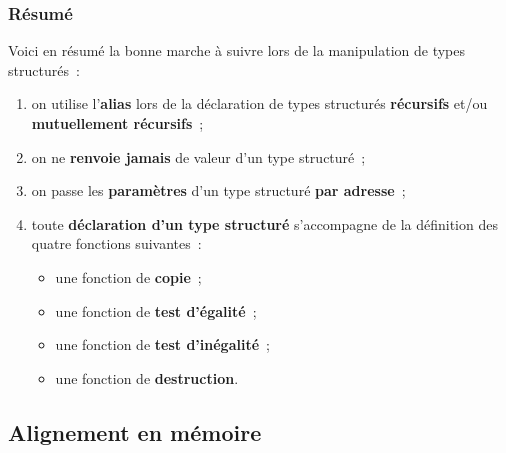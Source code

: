 \begin{frame}[fragile]
\frametitle{Résumé}
Voici en résumé la bonne marche à suivre lors de la manipulation de
types structurés~:
\smallskip

\begin{enumerate}
    \item on utilise l'{\bf alias} lors de la déclaration de types structurés
    {\bf récursifs} et/ou {\bf mutuellement récursifs}~;
    \medskip

    \item on ne {\bf renvoie jamais} de valeur d'un type structuré~;
    \medskip

    \item on passe les {\bf paramètres} d'un type structuré {\bf par adresse}~;
    \medskip

    \item toute {\bf déclaration d'un type structuré} s'accompagne de la
    définition des quatre fonctions suivantes~:
    \begin{itemize} \normalsize
        \item une fonction de {\bf copie}~;
        \item une fonction de {\bf test d'égalité}~;
        \item une fonction de {\bf test d'inégalité}~;
        \item une fonction de {\bf destruction}.
    \end{itemize}
\end{enumerate}
\end{frame}

\subsection{Alignement en mémoire}

